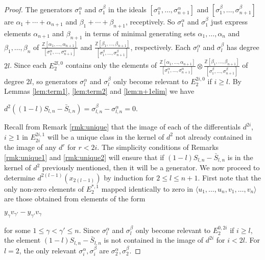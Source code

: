 \documentclass{article}
\theoremstyle{plain}
\theoremstyle{definition}
\numberwithin{thm}{section}
\begin{document}
				\begin{proof}
				The generators $\sigma_1^\alpha$ and $\sigma_1^\beta$ in the ideals $[\sigma^{\alpha}_1,\dots,\sigma^{\alpha}_{n+1}]$ and $[\sigma^{\beta}_1,\dots,\sigma^{\beta}_{n+1}]$
				are $\alpha_1+\cdots+\alpha_{n+1}$ and $\beta_1+\cdots+\beta_{n+1}$, receptively.
				So $\sigma_1^\alpha$ and $\sigma_1^\beta$ just express elements $\alpha_{n+1}$ and $\beta_{n+1}$ in terms of minimal generating sets $\alpha_1,\dots,\alpha_{n}$
				and $\beta_1,\dots,\beta_{n}$ of $\frac{\mathbb{Z}[\alpha_1,\dots,\alpha_{n+1}]}{[\sigma^{\alpha}_1,\dots,\sigma^{\alpha}_{n+1}]}$ and
				$\frac{\mathbb{Z}[\beta_1,\dots,\beta_{n+1}]}{[\sigma^{\beta}_1,\dots,\sigma^{\beta}_{n+1}]}$, respectively.
				Each $\sigma^\alpha_l$ and $\sigma^\beta_l$ has degree $2l$.
				Since each $E_2^{2l,0}$ contains only the elements of $ 
				\frac{\mathbb{Z}[\alpha_1,\dots,\alpha_{n+1}]}{[\sigma^{\alpha}_1,\dots,\sigma^{\alpha}_{n+1}]} \otimes
				\frac{\mathbb{Z}[\beta_1,\dots,\beta_{n+1}]}{[\sigma^{\beta}_1,\dots,\sigma^{\beta}_{n+1}]}$ of degree $2l$,
				so generators $\sigma^\alpha_l$ and $\sigma^\beta_l$ only become relevant to $E_2^{2i,0}$ if $i\geq l$.
				By Lemmas \ref{lem:term1}, \ref{lem:term2} and \ref{lem:n+1elim} we have
				\begin{center}
				$d^{2}((1-l)S_{l,n}-\bar{S}_{l,n})=\sigma_{l,n}^\beta-\sigma_{l,n}^\alpha=0$.
				\end{center}
				Recall from Remark \ref{rmk:unique} that the image of each of the differentials $d^{2i}$, $i \geq 1$ in $E_{2i}^{2i,1}$ will be a unique class
				in the kernel of $d^2$ not already contained in the image of any $d^r$ for $r<2i$.
				The simplicity conditions of Remarks \ref{rmk:unique1} and \ref{rmk:unique2} will ensure that if $(1-l)S_{l,n}-\bar{S}_{l,n}$
				is in the kernel of $d^2$ previously mentioned, then it will be a generator. 
				We now proceed to determine $d^{2(l-1)}(x_{2(l-1)})$ by induction for $2\leq l\leq n+1$.
				First note that the only non-zero elements of $E_2^{*,1}$ mapped identically to zero in $\langle u_1,\dots,u_n,v_1,\dots,v_n \rangle$
				are those obtained from elements of the form
				\begin{center}
				$y_\gamma v_{\gamma'}-y_{\gamma'}v_\gamma$
				\end{center}
				for some $1\leq \gamma < \gamma' \leq n$.
				Since $\sigma^\alpha_l$ and $\sigma^\beta_l$ only become relevant to $E_2^{0,2i}$ if $i\geq l$, the element $(1-l)S_{l,n}-\bar{S}_{l,n}$
				is not contained in the image of $d^{2i}$ for $i<2l$.
				For $l=2$, the only relevant $\sigma^\alpha_i,\sigma_i^\beta$ are $\sigma_2^\alpha,\sigma_2^\beta$.

\end{proof}
\end{document}
